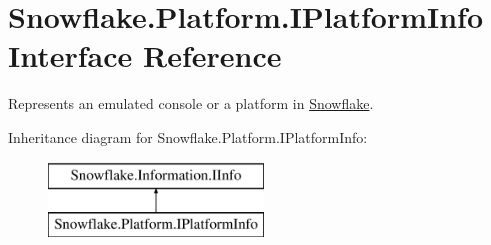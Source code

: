 \hypertarget{interface_snowflake_1_1_platform_1_1_i_platform_info}{}\section{Snowflake.\+Platform.\+I\+Platform\+Info Interface Reference}
\label{interface_snowflake_1_1_platform_1_1_i_platform_info}


Represents an emulated console or a platform in \hyperlink{namespace_snowflake}{Snowflake}.  


Inheritance diagram for Snowflake.\+Platform.\+I\+Platform\+Info\+:\begin{figure}[H]
\begin{center}
\leavevmode
\includegraphics[height=2.000000cm]{interface_snowflake_1_1_platform_1_1_i_platform_info}
\end{center}
\end{figure}
